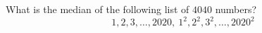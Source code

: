 What is the median of the following list of $4040$ numbers?
\[1,2,3,\dots,2020,\ 1^2,2^2,3^2,\dots,2020^2\]
